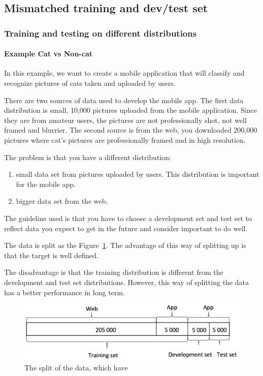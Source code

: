 \documentclass[UTF8]{article}
\begin{document}
\subsection{Mismatched training and dev/test set}
\subsubsection{Training and testing on different distributions}
\paragraph{Example Cat vs Non-cat}
In this example, we want to create a mobile application that will classify and recognize pictures
of cats taken and uploaded by users.

There are two sources of data used to develop the mobile app. The first data distribution is small,
10,000 pictures uploaded from the mobile application. Since they are from amateur users, the
pictures are not professionally shot, not well framed and blurrier. The second source is from the
web, you downloaded 200,000 pictures where cat’s pictures are professionally framed and in high
resolution.

The problem is that you have a different distribution:
\begin{enumerate}
    \item small data set from pictures uploaded by users. This distribution is important for the
    mobile app.
    \item bigger data set from the web.
\end{enumerate}

The guideline used is that you have to choose a development set and test set to reflect data you
expect to get in the future and consider important to do well.

The data is split as the Figure~\ref{fig:split-data-with-two-diff-sources}. The advantage of this
way of splitting up is that the target is well defined.

The disadvantage is that the training distribution is different from the development and test set
distributions. However, this way of splitting the data has a better performance in long term.

\begin{figure}[htb]
    \centering
    \includegraphics[width=40em]{figures/split-data-with-two-diff-sources}
    \caption{The split of the data, which have }
    \label{fig:split-data-with-two-diff-sources}
\end{figure}
\end{document}
